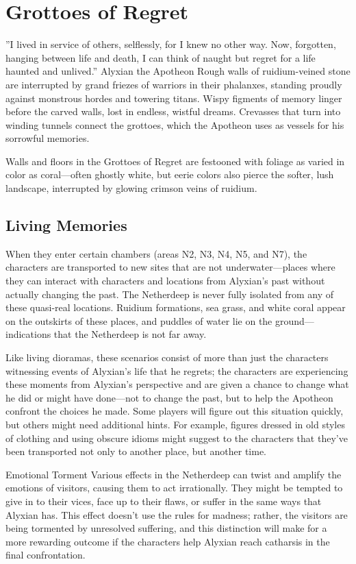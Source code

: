 \documentclass[10pt,a4paper,twoside,bg=print,twocolumn,openany,nodeprecatedcode]{dndbook}
\begin{document}
\section{Grottoes of Regret}
\DndQuote%
{}
{''I lived in service of others, selflessly, for I knew no other way. Now, forgotten, hanging between life and death, I can think of naught but regret for a life haunted and unlived.''}
{Alyxian the Apotheon}
Rough walls of ruidium-veined stone are interrupted by grand friezes of warriors in their phalanxes, standing proudly against monstrous hordes and towering titans. Wispy figments of memory linger before the carved walls, lost in endless, wistful dreams. Crevasses that turn into winding tunnels connect the grottoes, which the Apotheon uses as vessels for his sorrowful memories.

Walls and floors in the Grottoes of Regret are festooned with foliage as varied in color as coral—often ghostly white, but eerie colors also pierce the softer, lush landscape, interrupted by glowing crimson veins of ruidium.

\subsection{Living Memories}
When they enter certain chambers (areas N2, N3, N4, N5, and N7), the characters are transported to new sites that are not underwater—places where they can interact with characters and locations from Alyxian's past without actually changing the past. The Netherdeep is never fully isolated from any of these quasi-real locations. Ruidium formations, sea grass, and white coral appear on the outskirts of these places, and puddles of water lie on the ground—indications that the Netherdeep is not far away.

Like living dioramas, these scenarios consist of more than just the characters witnessing events of Alyxian's life that he regrets; the characters are experiencing these moments from Alyxian's perspective and are given a chance to change what he did or might have done—not to change the past, but to help the Apotheon confront the choices he made. Some players will figure out this situation quickly, but others might need additional hints. For example, figures dressed in old styles of clothing and using obscure idioms might suggest to the characters that they've been transported not only to another place, but another time.

\begin{DndSidebar}[float=!b]{Emotional Torment}
Various effects in the Netherdeep can twist and amplify the emotions of visitors, causing them to act irrationally. They might be tempted to give in to their vices, face up to their flaws, or suffer in the same ways that Alyxian has. This effect doesn't use the rules for madness; rather, the visitors are being tormented by unresolved suffering, and this distinction will make for a more rewarding outcome if the characters help Alyxian reach catharsis in the final confrontation.



\end{DndSidebar}
\end{document}
